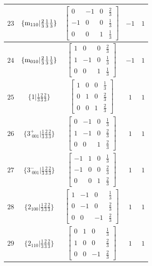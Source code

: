 \documentclass[fleqn,8pt]{jsarticle}
\begin{document}
\begin{longtable}{ccccc}
$ 23 $ & $ \{{\rm m}_{110}|\frac{2}{3} \frac{1}{3} \frac{1}{3}\} $ & $ \begin{bmatrix} 0 & -1 & 0 & \frac{2}{3} \\ -1 & 0 & 0 & \frac{1}{3} \\ 0 & 0 & 1 & \frac{1}{3} \end{bmatrix} $ & $ -1 $ & $ 1 $ \\ \hline
$ 24 $ & $ \{{\rm m}_{010}|\frac{2}{3} \frac{1}{3} \frac{1}{3}\} $ & $ \begin{bmatrix} 1 & 0 & 0 & \frac{2}{3} \\ 1 & -1 & 0 & \frac{1}{3} \\ 0 & 0 & 1 & \frac{1}{3} \end{bmatrix} $ & $ -1 $ & $ 1 $ \\ \hline
$ 25 $ & $ \{1|\frac{1}{3} \frac{2}{3} \frac{2}{3}\} $ & $ \begin{bmatrix} 1 & 0 & 0 & \frac{1}{3} \\ 0 & 1 & 0 & \frac{2}{3} \\ 0 & 0 & 1 & \frac{2}{3} \end{bmatrix} $ & $ 1 $ & $ 1 $ \\ \hline
$ 26 $ & $ \{3^{+}_{\,\,001}|\frac{1}{3} \frac{2}{3} \frac{2}{3}\} $ & $ \begin{bmatrix} 0 & -1 & 0 & \frac{1}{3} \\ 1 & -1 & 0 & \frac{2}{3} \\ 0 & 0 & 1 & \frac{2}{3} \end{bmatrix} $ & $ 1 $ & $ 1 $ \\ \hline
$ 27 $ & $ \{3^{-}_{\,\,001}|\frac{1}{3} \frac{2}{3} \frac{2}{3}\} $ & $ \begin{bmatrix} -1 & 1 & 0 & \frac{1}{3} \\ -1 & 0 & 0 & \frac{2}{3} \\ 0 & 0 & 1 & \frac{2}{3} \end{bmatrix} $ & $ 1 $ & $ 1 $ \\ \hline
$ 28 $ & $ \{2{}_{100}|\frac{1}{3} \frac{2}{3} \frac{2}{3}\} $ & $ \begin{bmatrix} 1 & -1 & 0 & \frac{1}{3} \\ 0 & -1 & 0 & \frac{2}{3} \\ 0 & 0 & -1 & \frac{2}{3} \end{bmatrix} $ & $ 1 $ & $ 1 $ \\ \hline
$ 29 $ & $ \{2{}_{110}|\frac{1}{3} \frac{2}{3} \frac{2}{3}\} $ & $ \begin{bmatrix} 0 & 1 & 0 & \frac{1}{3} \\ 1 & 0 & 0 & \frac{2}{3} \\ 0 & 0 & -1 & \frac{2}{3} \end{bmatrix} $ & $ 1 $ & $ 1 $ \\ \hline

\end{longtable}
\end{document}
